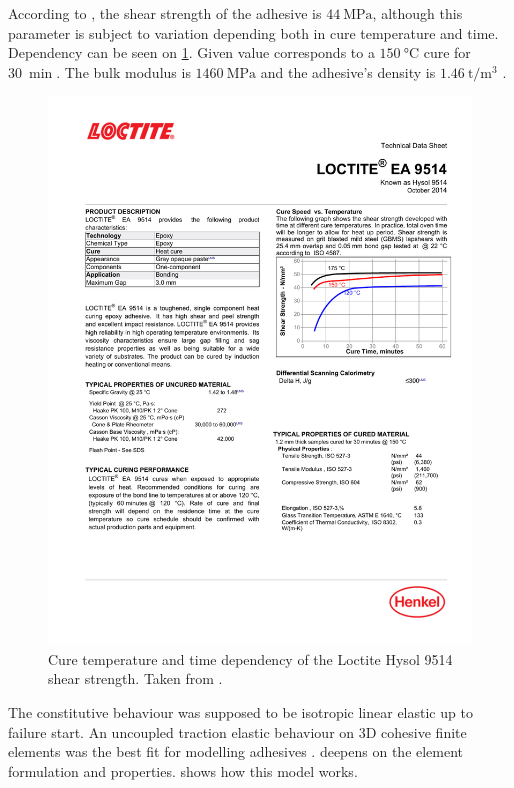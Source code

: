 \documentclass[cmfonts]{witpress}
\begin{document}
According to \cite{manufCatalog}, the shear strength of the adhesive is $\SI{44}{\MPa}$, although this parameter is subject to variation depending both in cure temperature and time. Dependency can be seen on \cref{fig:catalog_temp}. Given value corresponds to a $\SI{150}{\celsius}$ cure for $\SI{30}{\min}$. The bulk modulus is $\SI{1460}{\MPa}$ and the adhesive's density is $\SI{1.46}{\tonne/\m^3}$ \cite{manufCatalog}.

\begin{figure}
	\centering
	\includegraphics[width=0.7\linewidth]{figures/IMG_CUTRES/catalog_temp}
	\caption[Cure temperature and time dependency of the Loctite Hysol 9514 shear strength.]{Cure temperature and time dependency of the Loctite Hysol 9514 shear strength. Taken from \cite{manufCatalog}.}
	\label{fig:catalog_temp}
\end{figure}


The constitutive behaviour was supposed to be isotropic linear elastic \cite{SernaMoreno2015} up to failure start. An uncoupled traction elastic behaviour \cite{Sadowski2010, Sadowski2011, Scattina2011, Sadowski2014} on 3D cohesive finite elements was the best fit for modelling adhesives \cite{Abaqus613Manual}.  deepens on the element formulation and properties.  shows how this model works.
\end{document}
